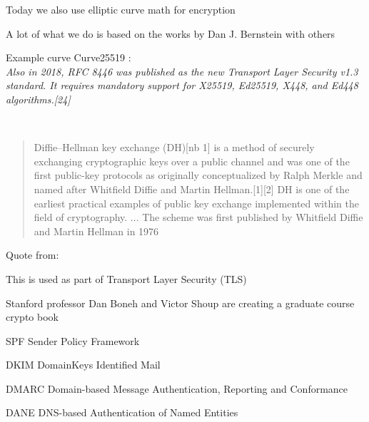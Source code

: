\documentclass[Screen16to9,17pt]{foils}
\begin{document}
\begin{list2}
\item Today we also use elliptic curve math for encryption 
\item A lot of what we do is based on the works by Dan J. Bernstein  with others
\item Example curve Curve25519 :\\
\emph{Also in 2018, RFC 8446 was published as the new Transport Layer Security v1.3 standard. It requires mandatory support for X25519, Ed25519, X448, and Ed448 algorithms.[24]}
\end{list2}



{~}

\begin{quote}
Diffie–Hellman key exchange (DH)[nb 1] is a method of securely exchanging cryptographic keys over a public channel and was one of the first public-key protocols as originally conceptualized by Ralph Merkle and named after Whitfield Diffie and Martin Hellman.[1][2] DH is one of the earliest practical examples of public key exchange implemented within the field of cryptography.
... The scheme was first published by Whitfield Diffie and Martin Hellman in 1976
\end{quote}

\begin{list2}
\item Quote from: {\small {}}
\item This is used as part of Transport Layer Security (TLS)
\item Stanford professor Dan Boneh and Victor Shoup are creating a graduate course crypto book  
\end{list2}



\begin{list2}
\item SPF Sender Policy Framework\\ {\footnotesize{}}
\item DKIM DomainKeys Identified Mail\\
{\footnotesize{}}
\item DMARC Domain-based Message Authentication, Reporting and Conformance\\
{\footnotesize{}}
\item DANE DNS-based Authentication of Named Entities\\ {\footnotesize{}}
\end{list2}
\end{document}
